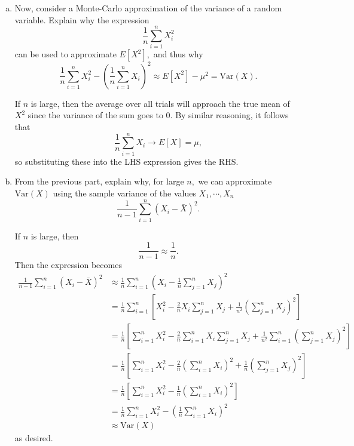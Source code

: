 \documentclass{article}
\newcommand{\var}{\mathrm{Var}}
\begin{document}
\begin{enumerate}
\begin{enumerate}[(a)]
\begin{soln}
				\end{soln}
				
			\item Now, consider a Monte-Carlo approximation of the variance of a random variable. Explain why the expression \[\frac{1}{n}\sum_{i=1}^n X_i^2\] can be used to approximate $E[X^2],$ and thus why \[\frac{1}{n}\sum_{i=1}^n X_i^2 - \left( \frac{1}{n}\sum_{i=1}^n X_i \right)^2 \approx E[X^2]-\mu^2=\var(X).\]
				\begin{soln}
					If $n$ is large, then the average over all trials will approach the true mean of $X^2$ since the variance of the sum goes to 0. By similar reasoning, it follows that \[\frac{1}{n}\sum_{i=1}^{n}X_i\to E[X]=\mu, \] so substituting these into the LHS expression gives the RHS.

				\end{soln}

			\item From the previous part, explain why, for large $n,$ we can approximate $\var(X)$ using the sample variance of the values $X_1, \cdots, X_n$ \[\frac{1}{n-1}\sum_{i=1}^n (X_i-\bar{X})^2.\]
				\begin{soln}
				If $n$ is large, then \[\frac{1}{n-1}\approx \frac{1}{n}.\] Then the expression becomes 
				\begin{align*}
					\frac{1}{n-1}\sum_{i=1}^{n}(X_i-\bar{X})^2 &\approx \frac{1}{n}\sum_{i=1}^{n}\left( X_i-\frac{1}{n}\sum_{j=1}^{n}X_j \right)^2 \\
					&= \frac{1}{n} \sum_{i=1}^{n}\left[ X_i^2 - \frac{2}{n}X_i\sum_{j=1}^{n} X_j + \frac{1}{n^2}\left(\sum_{j=1}^{n}X_j\right)^2 \right] \\
					&= \frac{1}{n}\left[ \sum_{i=1}^{n} X_i^2 - \frac{2}{n}\sum_{i=1}^{n}X_i\sum_{j=1}^{n} X_j + \frac{1}{n^2}\sum_{i=1}^{n}\left( \sum_{j=1}^{n} X_j \right)^2 \right] \\
					&= \frac{1}{n}\left[ \sum_{i=1}^{n}X_i^2 - \frac{2}{n}\left( \sum_{i=1}^{n} X_i \right)^2 + \frac{1}{n}\left( \sum_{j=1}^{n} X_j \right)^2  \right] \\
					&= \frac{1}{n} \left[ \sum_{i=1}^{n} X_i^2 - \frac{1}{n}\left(\sum_{i=1}^{n} X_i\right)^2\right] \\
					&= \frac{1}{n}\sum_{i=1}^{n} X_i^2 - \left( \frac{1}{n}\sum_{i=1}^{n} X_i \right)^2 \\
					&\approx \var(X)
				\end{align*} as desired.
				
				\end{soln}


\end{enumerate}
\end{enumerate}
\end{document}
